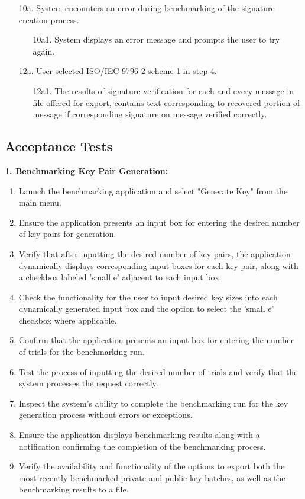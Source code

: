 \documentclass[]{final_report}
\theoremstyle{definition}
\begin{document}
\begin{enumerate}
    \item[10a.] System encounters an error during benchmarking of the signature creation process.
    \begin{enumerate}
        \item[10a1.] System displays an error message and prompts the user to try again.
    \end{enumerate}
    \item[12a.]  User selected ISO\slash IEC 9796-2 scheme 1 in step 4.
    \begin{enumerate}
        \item[12a1.] The results of signature verification for each and every message in file offered for export, contains text corresponding to recovered portion of message if corresponding signature on message verified correctly.
    \end{enumerate}
\end{enumerate}





\subsection{Acceptance Tests}


\textbf{1. Benchmarking Key Pair Generation:}
\begin{enumerate}
\item Launch the benchmarking application and select "Generate Key" from the main menu.
\item Ensure the application presents an input box for entering the desired number of key pairs for generation.
\item Verify that after inputting the desired number of key pairs, the application dynamically displays corresponding input boxes for each key pair, along with a checkbox labeled 'small e' adjacent to each input box.
\item Check the functionality for the user to input desired key sizes into each dynamically generated input box and the option to select the 'small e' checkbox where applicable.
\item Confirm that the application presents an input box for entering the number of trials for the benchmarking run.
\item Test the process of inputting the desired number of trials and verify that the system processes the request correctly.
\item Inspect the system's ability to complete the benchmarking run for the key generation process without errors or exceptions.
\item Ensure the application displays benchmarking results along with a notification confirming the completion of the benchmarking process.
\item Verify the availability and functionality of the options to export both the most recently benchmarked private and public key batches, as well as the benchmarking results to a file.
\end{enumerate}
\end{document}
